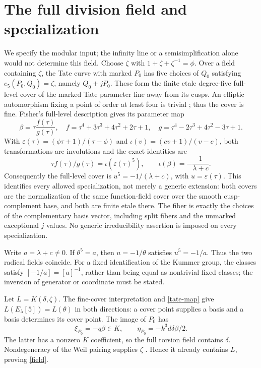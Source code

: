 \documentclass[11pt]{article}
\begin{document}
\section{The full division field and specialization}
We specify the modular input; the infinity line or a semisimplification
alone would not determine this field. Choose $\zeta$ with
$1+\zeta+\zeta^{-1}=\phi$. Over a field containing $\zeta$, the Tate
curve with marked $P_0$ has five choices of $Q_0$ satisfying
$e_5(P_0,Q_0)=\zeta$, namely $Q_0+jP_0$. These form the finite etale
degree-five full-level cover of the marked Tate parameter line away
from its cusps. An elliptic automorphism fixing a point of order at
least four is trivial \cite[Lemma 1.1]{fisher}; thus the cover is fine.
Fisher's full-level description \cite[section 2 and Lemma 3.4,
p.~194]{fisher} gives its parameter map
\[
\beta=\tau\frac{f(\tau)}{g(\tau)},\quad
f=\tau^4+3\tau^3+4\tau^2+2\tau+1,\quad
g=\tau^4-2\tau^3+4\tau^2-3\tau+1.
\]
With $\varepsilon(\tau)=(\phi\tau+1)/(\tau-\phi)$ and
$\iota(v)=(cv+1)/(v-c)$, both transformations are involutions and
the exact identities are
\begin{equation}\label{kummer}
\tau f(\tau)/g(\tau)=\iota(\varepsilon(\tau)^5),\qquad
\iota(\beta)=-\frac1{\lambda+c}.
\end{equation}
Consequently the full-level cover is $u^5=-1/(\lambda+c)$, with
$u=\varepsilon(\tau)$. This identifies every allowed specialization,
not merely a generic extension: both covers are the normalization of
the same function-field cover over the smooth cusp-complement base,
and both are finite etale there. The fiber is exactly the choices of
the complementary basis vector, including split fibers and the
unmarked exceptional $j$ values. No generic irreducibility assertion
is imposed on every specialization.

Write $a=\lambda+c\ne0$. If $\theta^5=a$, then $u=-1/\theta$ satisfies
$u^5=-1/a$. Thus the two radical fields coincide. For a fixed
identification of the Kummer group, the classes satisfy
$[-1/a]=[a]^{-1}$, rather than being equal as nontrivial fixed classes;
the inversion of generator or coordinate must be stated.

Let $L=K(\delta,\zeta)$. The fine-cover interpretation and
\eqref{tate-map} give $L(E_\lambda[5])=L(\theta)$ in both directions:
a cover point supplies a basis and a basis determines its cover point.
The image of $P_0$ has
\[
\xi_{P_0}=-q\beta\in K,\qquad
\eta_{P_0}=-k^3d\delta\beta/2.
\]
The latter has a nonzero $K$ coefficient, so the full torsion field
contains $\delta$. Nondegeneracy of the Weil pairing supplies
$\zeta$ \cite[Theorem 23.29]{pairing}. Hence it already contains $L$,
proving \eqref{field}.
\end{document}
